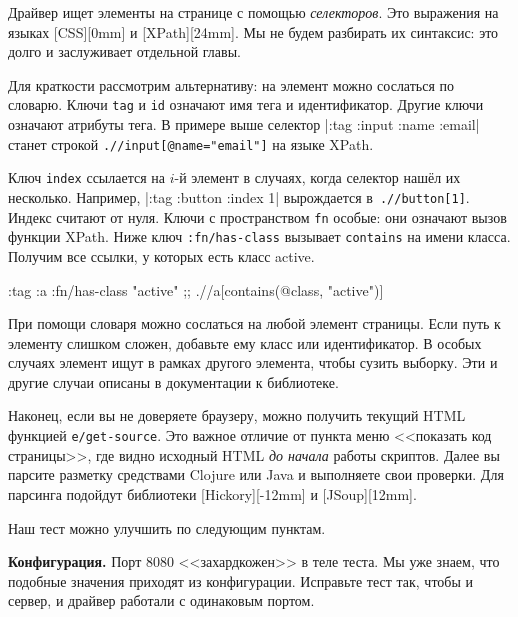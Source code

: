 
Драйвер ищет элементы на странице с помощью \emph{селекторов}. Это выражения на
языках [CSS][0mm] и
[XPath][24mm]. Мы не
будем разбирать их синтаксис: это долго и заслуживает отдельной главы.

Для краткости рассмотрим альтернативу: на элемент можно сослаться по
словарю. Ключи \verb|tag| и \verb|id| означают имя тега и идентификатор. Другие
ключи означают атрибуты тега. В примере выше селектор
\spverb|{:tag :input :name :email}| станет строкой
\verb|.//input[@name="email"]| на языке XPath.


Ключ \verb|index| ссылается на $i$-й элемент в случаях, когда селектор нашёл их
несколько. Например, \spverb|{:tag :button :index 1}| вырождается
в~\verb|.//button[1]|. Индекс считают от нуля. Ключи с пространством \verb|fn|
особые: они означают вызов функции XPath. Ниже ключ \verb|:fn/has-class|
вызывает \verb|contains| на имени класса. Получим все ссылки, у которых есть
класс active.

\begin{english}
  \begin{clojure}
{:tag :a :fn/has-class "active"}
;; .//a[contains(@class, "active")]
  \end{clojure}
\end{english}

При помощи словаря можно сослаться на любой элемент страницы. Если путь к
элементу слишком сложен, добавьте ему класс или идентификатор. В особых случаях
элемент ищут в рамках другого элемента, чтобы сузить выборку. Эти и другие
случаи описаны в документации к библиотеке.

Наконец, если вы не доверяете браузеру, можно получить текущий HTML функцией
\verb|e/get-source|. Это важное отличие от пункта меню <<показать код
страницы>>, где видно исходный HTML \emph{до начала} работы скриптов. Далее вы
парсите разметку средствами Clojure или Java и выполняете свои проверки. Для
парсинга подойдут библиотеки
[Hickory][-12mm] и
[JSoup][12mm].


Наш тест можно улучшить по следующим пунктам.

\textbf{Конфигурация.} Порт 8080 <<захардкожен>> в теле теста. Мы уже знаем, что
подобные значения приходят из конфигурации. Исправьте тест так, чтобы и сервер,
и драйвер работали с одинаковым портом.

